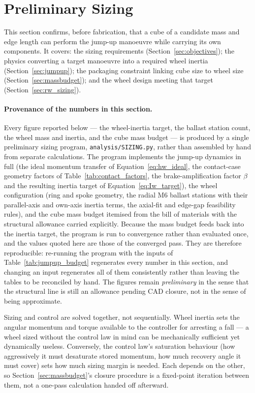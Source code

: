 \section{Preliminary Sizing}
\label{sec:sizing}

This section confirms, before fabrication, that a cube of a candidate mass and
edge length can perform the jump-up manoeuvre while carrying its own
components. It covers: the sizing requirements
(Section~\ref{sec:objectives}); the physics converting a target manoeuvre into
a required wheel inertia (Section~\ref{sec:jumpup}); the packaging constraint
linking cube size to wheel size (Section~\ref{sec:massbudget}); and the wheel
design meeting that target (Section~\ref{sec:rw_sizing}).

\paragraph{Provenance of the numbers in this section.} Every figure reported
below --- the wheel-inertia target, the ballast station count, the wheel mass
and inertia, and the cube mass budget --- is produced by a single preliminary
sizing program, \texttt{analysis/SIZING.py}, rather than assembled by hand from
separate calculations. The program implements the jump-up dynamics in full
(the ideal momentum transfer of Equation~\eqref{eq:hw_ideal}, the contact-case
geometry factors of Table~\ref{tab:contact_factors}, the brake-amplification
factor $\beta$ and the resulting inertia target of
Equation~\eqref{eq:Iw_target}), the wheel configuration (ring and spoke
geometry, the radial M6 ballast stations with their parallel-axis and own-axis
inertia terms, the axial-fit and edge-gap feasibility rules), and the cube mass
budget itemised from the bill of materials with the structural allowance
carried explicitly. Because the mass budget feeds back into the inertia target,
the program is run to convergence rather than evaluated once, and the values
quoted here are those of the converged pass. They are therefore reproducible:
re-running the program with the inputs of Table~\ref{tab:jumpup_budget}
regenerates every number in this section, and changing an input regenerates all
of them consistently rather than leaving the tables to be reconciled by hand.
The figures remain \emph{preliminary} in the sense that the structural line is
still an allowance pending CAD closure, not in the sense of being approximate.

Sizing and control are solved together, not sequentially. Wheel inertia sets
the angular momentum and torque available to the controller for arresting a
fall --- a wheel sized without the control law in mind can be mechanically
sufficient yet dynamically useless. Conversely, the control law's saturation
behaviour (how aggressively it must desaturate stored momentum, how much
recovery angle it must cover) sets how much sizing margin is needed. Each
depends on the other, so Section~\ref{sec:massbudget}'s closure procedure is a
fixed-point iteration between them, not a one-pass calculation handed off
afterward.


